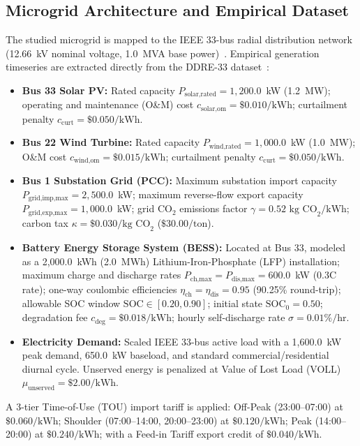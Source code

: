 \documentclass[conference]{IEEEtran}
\begin{document}
\subsection{Microgrid Architecture and Empirical Dataset}
The studied microgrid is mapped to the IEEE 33-bus radial distribution network (12.66~kV nominal voltage, 1.0~MVA base power)~\cite{baran1989network}. Empirical generation timeseries are extracted directly from the DDRE-33 dataset~\cite{chen2025ddre33}:
\begin{itemize}
    \item \textbf{Bus 33 Solar PV:} Rated capacity $P_{\text{solar,rated}} = 1,200.0$~kW (1.2~MW); operating and maintenance (O\&M) cost $c_{\text{solar,om}} = \$0.010/\text{kWh}$; curtailment penalty $c_{\text{curt}} = \$0.050/\text{kWh}$.
    \item \textbf{Bus 22 Wind Turbine:} Rated capacity $P_{\text{wind,rated}} = 1,000.0$~kW (1.0~MW); O\&M cost $c_{\text{wind,om}} = \$0.015/\text{kWh}$; curtailment penalty $c_{\text{curt}} = \$0.050/\text{kWh}$.
    \item \textbf{Bus 1 Substation Grid (PCC):} Maximum substation import capacity $P_{\text{grid,imp,max}} = 2,500.0$~kW; maximum reverse-flow export capacity $P_{\text{grid,exp,max}} = 1,000.0$~kW; grid $\text{CO}_2$ emissions factor $\gamma = 0.52\text{ kg CO}_2/\text{kWh}$; carbon tax $\kappa = \$0.030/\text{kg CO}_2$ ($\$30.00/\text{ton}$).
    \item \textbf{Battery Energy Storage System (BESS):} Located at Bus 33, modeled as a 2,000.0~kWh (2.0~MWh) Lithium-Iron-Phosphate (LFP) installation; maximum charge and discharge rates $P_{\text{ch,max}} = P_{\text{dis,max}} = 600.0$~kW (0.3C rate); one-way coulombic efficiencies $\eta_{\text{ch}} = \eta_{\text{dis}} = 0.95$ (90.25\% round-trip); allowable SOC window $\text{SOC} \in [0.20, 0.90]$; initial state $\text{SOC}_0 = 0.50$; degradation fee $c_{\text{deg}} = \$0.018/\text{kWh}$; hourly self-discharge rate $\sigma = 0.01\%/\text{hr}$.
    \item \textbf{Electricity Demand:} Scaled IEEE 33-bus active load with a 1,600.0~kW peak demand, 650.0~kW baseload, and standard commercial/residential diurnal cycle. Unserved energy is penalized at Value of Lost Load (VOLL) $\mu_{\text{unserved}} = \$2.00/\text{kWh}$.
\end{itemize}

A 3-tier Time-of-Use (TOU) import tariff is applied: Off-Peak (23:00--07:00) at $\$0.060/\text{kWh}$; Shoulder (07:00--14:00, 20:00--23:00) at $\$0.120/\text{kWh}$; Peak (14:00--20:00) at $\$0.240/\text{kWh}$; with a Feed-in Tariff export credit of $\$0.040/\text{kWh}$.
\end{document}
